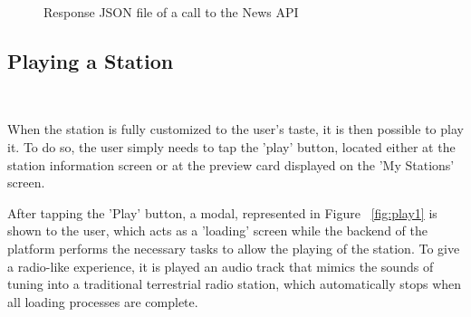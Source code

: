 \begin{figure}[h]
\centering
{}
\caption{Response JSON file of a call to the News API}
\label{fig:mys}
\end{figure}

\newpage
\subsection{Playing a Station}
~\label{subs:playing}

When the station is fully customized to the user's taste, it is then possible to play it. To do so, the user simply needs to tap the 'play' button, located either at the station information screen or at the preview card displayed on the 'My Stations' screen. 

After tapping the 'Play' button, a modal, represented in Figure ~\ref{fig:play1} is shown to the user, which acts as a 'loading' screen while the backend of the platform performs the necessary tasks to allow the playing of the station. To give a radio-like experience, it is played an audio track that mimics the sounds of tuning into a traditional terrestrial radio station, which automatically stops when all loading processes are complete. 

